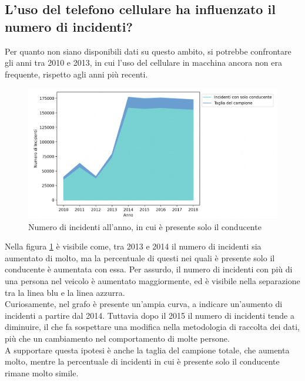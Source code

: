 \documentclass[a4paper]{report}
\begin{document}
\subsection{L'uso del telefono cellulare ha influenzato il numero di incidenti?}

Per quanto non siano disponibili dati su questo ambito, si potrebbe confrontare gli anni tra 2010 e 2013, 
in cui l'uso del cellulare in macchina ancora non era frequente, rispetto agli anni più recenti.

\begin{figure}
    \includegraphics[width=\linewidth]{../src/incidenti/incidenti_senza_coords/anno/incremento_incidenti.png}
    \caption{Numero di incidenti all'anno, in cui è presente solo il conducente}
    \label{fig:incremento-incidenti}
\end{figure}

Nella figura \ref{fig:incremento-incidenti} è visibile come, 
tra 2013 e 2014 il numero di incidenti sia aumentato di molto, 
ma la percentuale di questi nei quali è presente solo il conducente è aumentata con essa.
Per assurdo, il numero di incidenti con più di una persona nel veicolo è aumentato maggiormente, 
ed è visibile nella separazione tra la linea blu e la linea azzurra.\\

Curiosamente, nel grafo è presente un'ampia curva, a indicare un'aumento di incidenti 
a partire dal 2014. Tuttavia dopo il 2015 il numero di incidenti tende a diminuire, il che 
fa sospettare una modifica nella metodologia di raccolta dei dati, più che un cambiamento 
nel comportamento di molte persone.\\
A supportare questa ipotesi è anche la taglia del campione totale, che aumenta molto, mentre la 
percentuale di incidenti in cui è presente solo il conducente rimane molto simile.
\end{document}
